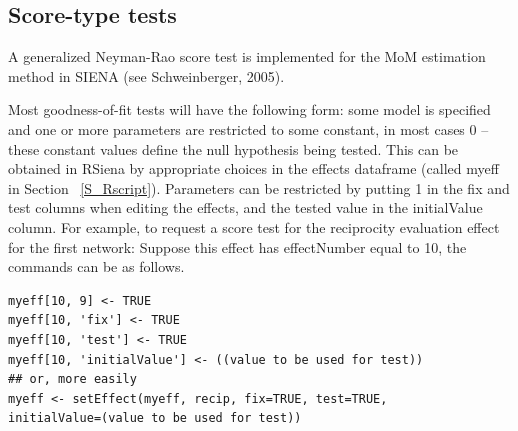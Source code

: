 \documentclass[a4paper,fleqn]{article}
\newcommand{\+}{\, + \,}
\newcommand{\sfn}[1]{\textsf{#1}}
\newcommand{\RS}{{\sf RSiena }}
\newcommand{\SI}{{\sf SIENA }}
\begin{document}
{\begin{enumerate}

\end{enumerate}

\subsection{Score-type tests}
\label{howtodo}

A generalized Neyman-Rao score test
is implemented for the MoM estimation method
in \SI (see Schweinberger, 2005).

Most goodness-of-fit tests will have the following form: some model
is specified and one or more parameters are restricted to some
constant, in most cases $0$ -- these constant values
define the null hypothesis being tested.
This can be obtained in \RS by appropriate choices in the effects dataframe
(called \sfn{myeff} in Section~ \ref{S_Rscript}).
Parameters can be restricted by
putting 1 in the \sfn{fix} and \sfn{test} columns when editing the effects, and
the tested value in the \sfn{initialValue} column.
For example, to request a score test for the reciprocity evaluation effect for
the first network: Suppose this effect has \sfn{effectNumber} equal to 10, the
commands can be as follows.

\begin{verbatim}
myeff[10, 9] <- TRUE
myeff[10, 'fix'] <- TRUE
myeff[10, 'test'] <- TRUE
myeff[10, 'initialValue'] <- ((value to be used for test))
## or, more easily
myeff <- setEffect(myeff, recip, fix=TRUE, test=TRUE,
initialValue=(value to be used for test))
\end{verbatim}




}
\end{document}
